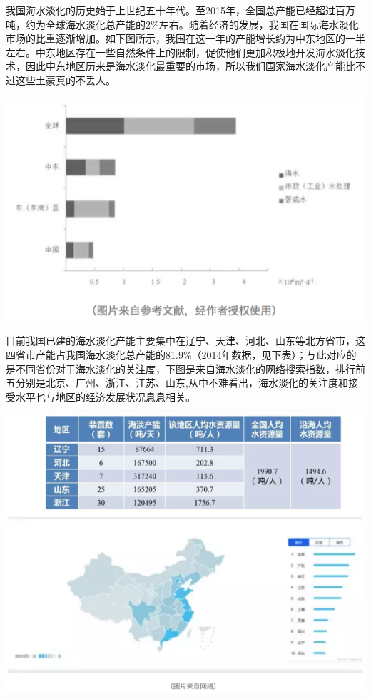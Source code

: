 \documentclass[]{book}
\begin{document}
我国海水淡化的历史始于上世纪五十年代。至2015年，全国总产能已经超过百万吨，约为全球海水淡化总产能的2\%左右。随着经济的发展，我国在国际海水淡化市场的比重逐渐增加。如下图所示，我国在这一年的产能增长约为中东地区的一半左右。中东地区存在一些自然条件上的限制，促使他们更加积极地开发海水淡化技术，因此中东地区历来是海水淡化最重要的市场，所以我们国家海水淡化产能比不过这些土豪真的不丢人。

\includegraphics[width=8.33in]{images/seawater4}

目前我国已建的海水淡化产能主要集中在辽宁、天津、河北、山东等北方省市，这四省市产能占我国海水淡化总产能的81.9\%（2014年数据，见下表）；与此对应的是不同省份对于海水淡化的关注度，下图是来自海水淡化的网络搜索指数，排行前五分别是北京、广州、浙江、江苏、山东,从中不难看出，海水淡化的关注度和接受水平也与地区的经济发展状况息息相关。

\includegraphics[width=8.33in]{images/seawater5}
\end{document}
